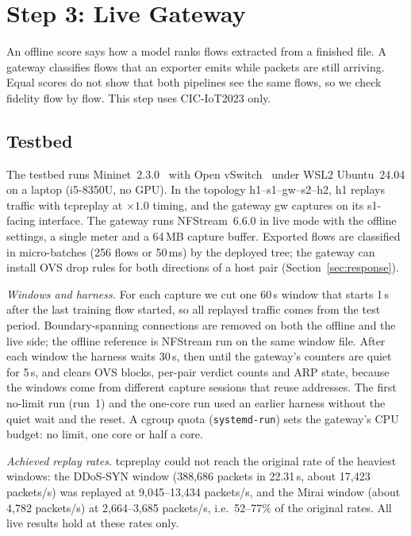 \section{Step 3: Live Gateway}\label{sec:live}

An offline score says how a model ranks flows extracted from a finished file. A gateway classifies flows that an exporter emits while packets are still arriving. Equal scores do not show that both pipelines see the same flows, so we check fidelity flow by flow. This step uses CIC-IoT2023 only.

\subsection{Testbed}\label{sec:testbed}

The testbed runs Mininet~2.3.0~\cite{lantz2010mininet} with Open vSwitch~\cite{pfaff2015ovs} under WSL2 Ubuntu~24.04 on a laptop (i5-8350U, no GPU). In the topology h1--s1--gw--s2--h2, h1 replays traffic with tcpreplay at $\times1.0$ timing, and the gateway gw captures on its s1-facing interface. The gateway runs NFStream~6.6.0 in live mode with the offline settings, a single meter and a 64\,MB capture buffer. Exported flows are classified in micro-batches (256 flows or 50\,ms) by the deployed tree; the gateway can install OVS drop rules for both directions of a host pair (Section~\ref{sec:response}).

\emph{Windows and harness.} For each capture we cut one 60\,s window that starts 1\,s after the last training flow started, so all replayed traffic comes from the test period. Boundary-spanning connections are removed on both the offline and the live side; the offline reference is NFStream run on the same window file. After each window the harness waits 30\,s, then until the gateway's counters are quiet for 5\,s, and clears OVS blocks, per-pair verdict counts and ARP state, because the windows come from different capture sessions that reuse addresses. The first no-limit run (run~1) and the one-core run used an earlier harness without the quiet wait and the reset. A cgroup quota (\texttt{systemd-run}) sets the gateway's CPU budget: no limit, one core or half a core.

\emph{Achieved replay rates.} tcpreplay could not reach the original rate of the heaviest windows: the DDoS-SYN window (388,686 packets in 22.31\,s, about 17,423 packets/s) was replayed at 9,045--13,434 packets/s, and the Mirai window (about 4,782 packets/s) at 2,664--3,685 packets/s, i.e.\ 52--77\% of the original rates. All live results hold at these rates only.


